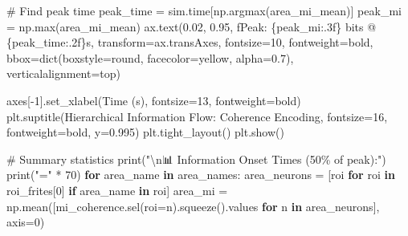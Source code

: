 \documentclass[
  11pt,
  letterpaper,
  oneside,
  openany]{book}
\newenvironment{Shaded}{\begin{snugshade}}{\end{snugshade}}
\newcommand{\BuiltInTok}[1]{\textcolor[rgb]{0.00,0.23,0.31}{#1}}
\newcommand{\CharTok}[1]{\textcolor[rgb]{0.13,0.47,0.30}{#1}}
\newcommand{\CommentTok}[1]{\textcolor[rgb]{0.37,0.37,0.37}{#1}}
\newcommand{\ControlFlowTok}[1]{\textcolor[rgb]{0.00,0.23,0.31}{\textbf{#1}}}
\newcommand{\DecValTok}[1]{\textcolor[rgb]{0.68,0.00,0.00}{#1}}
\newcommand{\FloatTok}[1]{\textcolor[rgb]{0.68,0.00,0.00}{#1}}
\newcommand{\KeywordTok}[1]{\textcolor[rgb]{0.00,0.23,0.31}{\textbf{#1}}}
\newcommand{\NormalTok}[1]{\textcolor[rgb]{0.00,0.23,0.31}{#1}}
\newcommand{\OperatorTok}[1]{\textcolor[rgb]{0.37,0.37,0.37}{#1}}
\newcommand{\SpecialCharTok}[1]{\textcolor[rgb]{0.37,0.37,0.37}{#1}}
\newcommand{\SpecialStringTok}[1]{\textcolor[rgb]{0.13,0.47,0.30}{#1}}
\newcommand{\StringTok}[1]{\textcolor[rgb]{0.13,0.47,0.30}{#1}}
\begin{document}
\begin{Shaded}
\begin{Highlighting}[]
    \CommentTok{\# Find peak time}
\NormalTok{    peak\_time }\OperatorTok{=}\NormalTok{ sim.time[np.argmax(area\_mi\_mean)]}
\NormalTok{    peak\_mi }\OperatorTok{=}\NormalTok{ np.}\BuiltInTok{max}\NormalTok{(area\_mi\_mean)}
\NormalTok{    ax.text(}\FloatTok{0.02}\NormalTok{, }\FloatTok{0.95}\NormalTok{, }\SpecialStringTok{f\textquotesingle{}Peak: }\SpecialCharTok{\{}\NormalTok{peak\_mi}\SpecialCharTok{:.3f\}}\SpecialStringTok{ bits @ }\SpecialCharTok{\{}\NormalTok{peak\_time}\SpecialCharTok{:.2f\}}\SpecialStringTok{s\textquotesingle{}}\NormalTok{,}
\NormalTok{           transform}\OperatorTok{=}\NormalTok{ax.transAxes, fontsize}\OperatorTok{=}\DecValTok{10}\NormalTok{, fontweight}\OperatorTok{=}\StringTok{\textquotesingle{}bold\textquotesingle{}}\NormalTok{,}
\NormalTok{           bbox}\OperatorTok{=}\BuiltInTok{dict}\NormalTok{(boxstyle}\OperatorTok{=}\StringTok{\textquotesingle{}round\textquotesingle{}}\NormalTok{, facecolor}\OperatorTok{=}\StringTok{\textquotesingle{}yellow\textquotesingle{}}\NormalTok{, alpha}\OperatorTok{=}\FloatTok{0.7}\NormalTok{),}
\NormalTok{           verticalalignment}\OperatorTok{=}\StringTok{\textquotesingle{}top\textquotesingle{}}\NormalTok{)}

\NormalTok{axes[}\OperatorTok{{-}}\DecValTok{1}\NormalTok{].set\_xlabel(}\StringTok{\textquotesingle{}Time (s)\textquotesingle{}}\NormalTok{, fontsize}\OperatorTok{=}\DecValTok{13}\NormalTok{, fontweight}\OperatorTok{=}\StringTok{\textquotesingle{}bold\textquotesingle{}}\NormalTok{)}
\NormalTok{plt.suptitle(}\StringTok{\textquotesingle{}Hierarchical Information Flow: Coherence Encoding\textquotesingle{}}\NormalTok{, }
\NormalTok{             fontsize}\OperatorTok{=}\DecValTok{16}\NormalTok{, fontweight}\OperatorTok{=}\StringTok{\textquotesingle{}bold\textquotesingle{}}\NormalTok{, y}\OperatorTok{=}\FloatTok{0.995}\NormalTok{)}
\NormalTok{plt.tight\_layout()}
\NormalTok{plt.show()}

\CommentTok{\# Summary statistics}
\BuiltInTok{print}\NormalTok{(}\StringTok{"}\CharTok{\textbackslash{}n}\StringTok{📊 Information Onset Times (50}\SpecialCharTok{\% o}\StringTok{f peak):"}\NormalTok{)}
\BuiltInTok{print}\NormalTok{(}\StringTok{"="} \OperatorTok{*} \DecValTok{70}\NormalTok{)}
\ControlFlowTok{for}\NormalTok{ area\_name }\KeywordTok{in}\NormalTok{ area\_names:}
\NormalTok{    area\_neurons }\OperatorTok{=}\NormalTok{ [roi }\ControlFlowTok{for}\NormalTok{ roi }\KeywordTok{in}\NormalTok{ roi\_frites[}\DecValTok{0}\NormalTok{] }\ControlFlowTok{if}\NormalTok{ area\_name }\KeywordTok{in}\NormalTok{ roi]}
\NormalTok{    area\_mi }\OperatorTok{=}\NormalTok{ np.mean([mi\_coherence.sel(roi}\OperatorTok{=}\NormalTok{n).squeeze().values }
                      \ControlFlowTok{for}\NormalTok{ n }\KeywordTok{in}\NormalTok{ area\_neurons], axis}\OperatorTok{=}\DecValTok{0}\NormalTok{)}
    

\end{Highlighting}
\end{Shaded}
\end{document}
